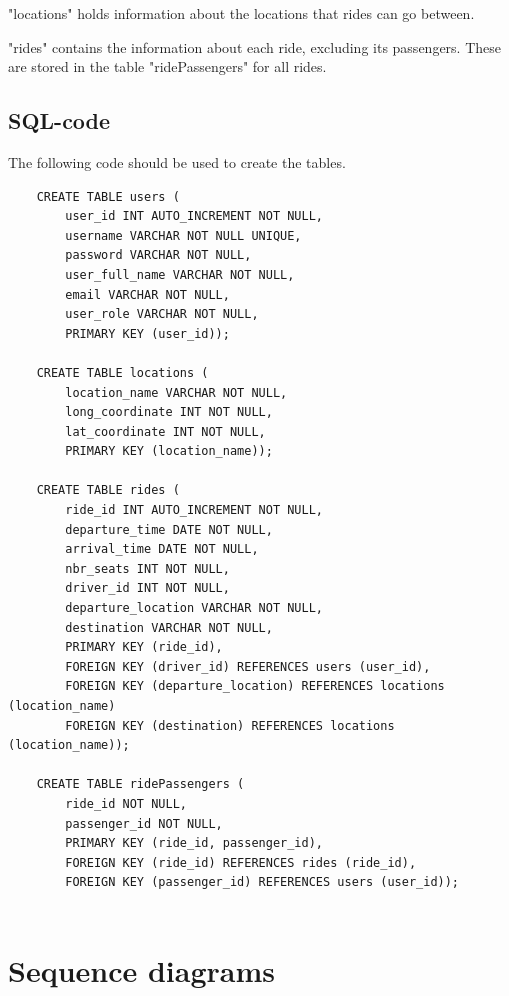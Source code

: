 \documentclass{article}
\begin{document}
"locations" holds information about the locations that rides can go between.

"rides" contains the information about each ride, excluding its passengers. These are stored in the table "ridePassengers" for all rides.

\subsection{SQL-code}
The following code should be used to create the tables.

\begin{verbatim}
    CREATE TABLE users (
        user_id INT AUTO_INCREMENT NOT NULL,
        username VARCHAR NOT NULL UNIQUE,
        password VARCHAR NOT NULL,
        user_full_name VARCHAR NOT NULL,
        email VARCHAR NOT NULL,
        user_role VARCHAR NOT NULL,
        PRIMARY KEY (user_id));
    
    CREATE TABLE locations (
        location_name VARCHAR NOT NULL,
        long_coordinate INT NOT NULL,
        lat_coordinate INT NOT NULL,
        PRIMARY KEY (location_name));
        
    CREATE TABLE rides (
        ride_id INT AUTO_INCREMENT NOT NULL,
        departure_time DATE NOT NULL,
        arrival_time DATE NOT NULL,
        nbr_seats INT NOT NULL,
        driver_id INT NOT NULL,
        departure_location VARCHAR NOT NULL,
        destination VARCHAR NOT NULL,
        PRIMARY KEY (ride_id),
        FOREIGN KEY (driver_id) REFERENCES users (user_id),
        FOREIGN KEY (departure_location) REFERENCES locations (location_name)
        FOREIGN KEY (destination) REFERENCES locations (location_name));
    
    CREATE TABLE ridePassengers (
        ride_id NOT NULL,
        passenger_id NOT NULL,
        PRIMARY KEY (ride_id, passenger_id),
        FOREIGN KEY (ride_id) REFERENCES rides (ride_id),
        FOREIGN KEY (passenger_id) REFERENCES users (user_id));
        
\end{verbatim}

\section{Sequence diagrams}
\end{document}
